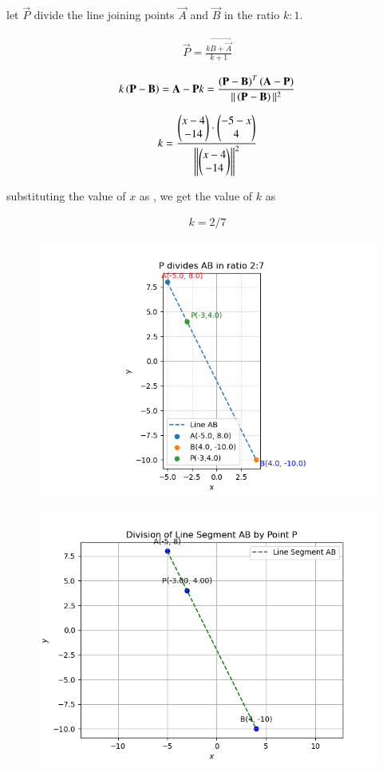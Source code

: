 \documentclass[journal]{IEEEtran}
\begin{document}
let $\vec{P}$ divide the line joining points $\vec{A}$ and $\vec{B}$ in the ratio $k:1$.

\begin{align}
    \vec{P}=\frac{k\vec{B+\vec{A}}}{k+1}
\end{align}

\begin{align}
    k\left(\mathbf{P}- \mathbf{B}\right) = \mathbf{A}-\mathbf{P}
k=\frac{\left(\mathbf{P}-\mathbf{B}\right)^T\left(\mathbf{A}-\mathbf{P}\right)}{||\left(\mathbf{P}-\mathbf{B}\right)||^2}    
\end{align}

\begin{align}
    k=\frac{\begin{pmatrix}x-4 \\ -14\end{pmatrix} \cdot \begin{pmatrix}-5-x\\4\end{pmatrix}}{{\left\lVert\begin{pmatrix}x-4 \\ -14\end{pmatrix}\right\rVert}^2}
\end{align}

substituting the value of $x$ as , we get the value of $k$ as

\begin{align}
    k=2/7
\end{align}

\begin{figure}[H]
    \centering
    \includegraphics[width=0.6\columnwidth]{figs/Figure.png}
\end{figure}

\begin{figure}[H]
    \centering
    \includegraphics[width=0.6\columnwidth]{figs/Figure_1.png}
\end{figure}
\end{document}
